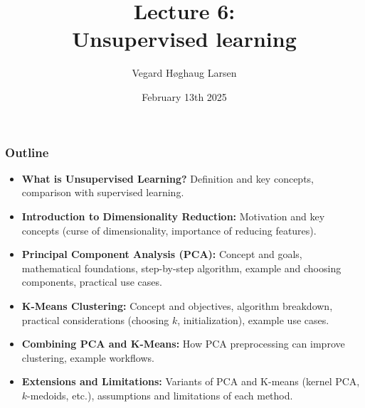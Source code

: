 \documentclass[aspectratio=169]{beamer}
\title{Lecture 6:\\ Unsupervised learning}
\institute{GRA4160: Predictive modelling with machine learning}
\date{February 13th 2025}
\author{Vegard H\o ghaug Larsen}
\begin{document}
\maketitle


\begin{frame}
      \frametitle{Outline}
      \begin{itemize}
            \item \textbf{What is Unsupervised Learning?} Definition and key concepts, comparison with supervised learning.
            \item \textbf{Introduction to Dimensionality Reduction:} Motivation and key concepts (curse of dimensionality, importance of reducing features).
            \item \textbf{Principal Component Analysis (PCA):} Concept and goals, mathematical foundations, step-by-step algorithm, example and choosing components, practical use cases.
            \item \textbf{K-Means Clustering:} Concept and objectives, algorithm breakdown, practical considerations (choosing $k$, initialization), example use cases.
            \item \textbf{Combining PCA and K-Means:} How PCA preprocessing can improve clustering, example workflows.
            \item \textbf{Extensions and Limitations:}  Variants of PCA and K-means (kernel PCA, $k$-medoids, etc.), assumptions and limitations of each method.
      \end{itemize}
\end{frame}

\end{document}
